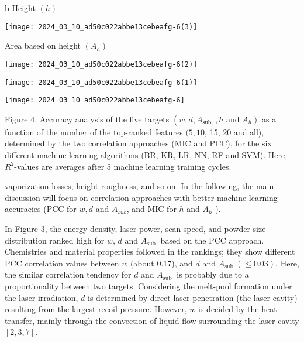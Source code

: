 \documentclass[10pt]{article}
\begin{document}
b Height $(h)$

\begin{center}
\texttt{[image: 2024\_03\_10\_ad50c022abbe13cebeafg-6(3)]}
\end{center}

Area based on height $\left(A_{h}\right)$

\begin{center}
\texttt{[image: 2024\_03\_10\_ad50c022abbe13cebeafg-6(2)]}
\end{center}

\begin{center}
\texttt{[image: 2024\_03\_10\_ad50c022abbe13cebeafg-6(1)]}
\end{center}

\begin{center}
\texttt{[image: 2024\_03\_10\_ad50c022abbe13cebeafg-6]}
\end{center}

Figure 4. Accuracy analysis of the five targets $\left(w, d, A_{\text {sub, }}, h\right.$ and $\left.A_{h}\right)$ as a function of the number of the top-ranked features $(5,10$, 15, 20 and all), determined by the two correlation approaches (MIC and PCC), for the six different machine learning algorithms (BR, KR, LR, NN, RF and SVM). Here, $R^{2}$-values are averages after 5 machine learning training cycles.

vaporization losses, height roughness, and so on. In the following, the main discussion will focus on correlation approaches with better machine learning accuracies (PCC for $w, d$ and $A_{s u b}$, and MIC for $h$ and $A_{h}$ ).

In Figure 3, the energy density, laser power, scan speed, and powder size distribution ranked high for $w$, $d$ and $A_{\text {sub }}$ based on the PCC approach. Chemistries and material properties followed in the rankings; they show different PCC correlation values between $w$ (about 0.17), and $d$ and $A_{\text {sub }}(\leq 0.03)$. Here, the similar correlation tendency for $d$ and $A_{\text {sub }}$ is probably due to a proportionality between two targets. Considering the melt-pool formation under the laser irradiation, $d$ is determined by direct laser penetration (the laser cavity) resulting from the largest recoil pressure. However, $w$ is decided by the heat transfer, mainly through the convection of liquid flow surrounding the laser cavity $[2,3,7]$.
\end{document}
